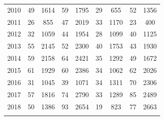 \documentclass[12pt,]{article}
\begin{document}
\begin{longtable}{ccccccccc}
  2010 & 49 & 1614 & 59 & 1795 & 29 & 655 & 52 & 1356 \\ 
  2011 & 26 & 855 & 47 & 2019 & 33 & 1170 & 23 & 400 \\ 
  2012 & 32 & 1059 & 44 & 1954 & 28 & 1099 & 40 & 1125 \\ 
  2013 & 55 & 2145 & 52 & 2300 & 40 & 1753 & 43 & 1930 \\ 
  2014 & 59 & 2158 & 64 & 2421 & 35 & 1292 & 49 & 1672 \\ 
  2015 & 61 & 1929 & 60 & 2386 & 34 & 1062 & 62 & 2026 \\ 
  2016 & 31 & 1045 & 39 & 1071 & 34 & 1311 & 70 & 2306 \\ 
  2017 & 57 & 1816 & 74 & 2790 & 33 & 1289 & 85 & 2489 \\ 
  2018 & 50 & 1386 & 93 & 2654 & 19 & 823 & 77 & 2663 \\ 
   \hline
\hline
\label{tab:Fishery_Lengths}
\end{longtable}

\FloatBarrier

\newpage
\end{document}
